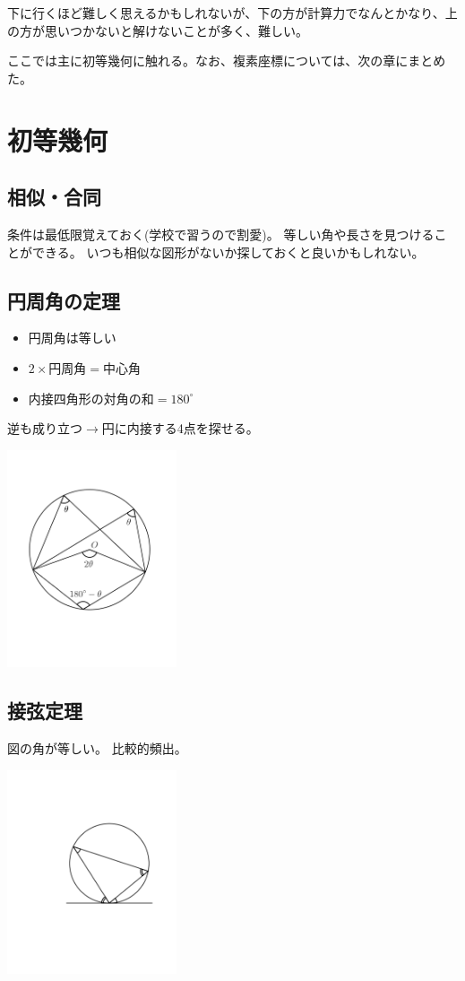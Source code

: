 \documentclass[uplatex,dvipdfmx]{jsbook}
\begin{document}
下に行くほど難しく思えるかもしれないが、下の方が計算力でなんとかなり、上の方が思いつかないと解けないことが多く、難しい。

ここでは主に初等幾何に触れる。なお、複素座標については、次の章にまとめた。
\section{初等幾何}

\subsection{相似・合同}
条件は最低限覚えておく(学校で習うので割愛)。
等しい角や長さを見つけることができる。
いつも相似な図形がないか探しておくと良いかもしれない。

\subsection{円周角の定理}

\begin{itemize}
    \item 円周角は等しい
    \item $2\times\text{円周角}=\text{中心角}$
    \item 内接四角形の対角の和$=180^{\circ}$
\end{itemize}

逆も成り立つ$\rightarrow$円に内接する4点を探せる。

\includegraphics[clip,width=5cm]{figures/inscribed-angle.pdf}

\subsection{接弦定理}
図の角が等しい。
比較的頻出。

\includegraphics[clip,width=5cm]{figures/setsugen.pdf}
\end{document}
